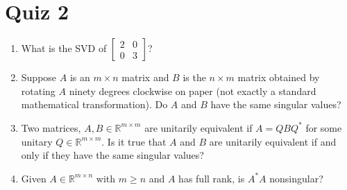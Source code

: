 \section*{Quiz 2}\label{sec:quiz-2}
\begin{enumerate}
    \item What is the SVD of \(\begin{bmatrix}2 & 0\\0 & 3\end{bmatrix}\)?
    \item Suppose \(A\) is an \(m\times n\) matrix and \(B\) is the \(n\times m\) matrix obtained by rotating \(A\) ninety degrees clockwise on paper (not exactly a standard mathematical transformation). Do \(A\) and \(B\) have the same singular values?
    \item Two matrices, \(A, B\in\mathbb{R}^{m\times m}\) are unitarily equivalent if \(A=QBQ^*\) for some unitary \(Q\in\mathbb{R}^{m\times m}\). Is it true that \(A\) and \(B\) are unitarily equivalent if and only if they have the same singular values?
    \item Given \(A\in\mathbb{R}^{m\times n}\) with \(m\geq n\) and \(A\) has full rank, is \(A^*A\) nonsingular?
\end{enumerate}
